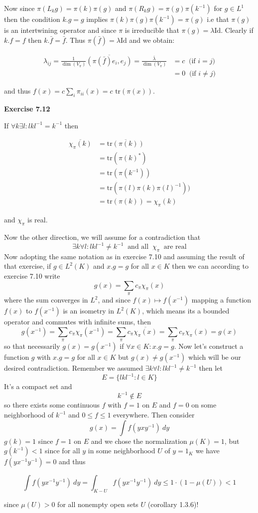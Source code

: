 \documentclass{article}
\begin{document}
Now since $\pi(L_kg) = \pi(k)\pi(g)$ and $\pi(R_kg) = \pi(g)\pi(k^{-1})$ for $g \in L^1$ then the condition $k.g = g$ implies $\pi(k)\pi(g) \pi(k^{-1}) = \pi(g)$ i.e that $\pi(g)$ is an intertwining operator and since $\pi$ is irreducible that $\pi(g) = \lambda  \text{Id}$. Clearly if $k.f = f$ then $k.\bar f = \bar f$. Thus $\pi(\bar f) = \lambda \text{Id}$ and we obtain:

\begin{align*}
     \lambda_{ij} = \frac{1}{\dim(V_\pi)} \overline{(\pi(\bar f)e_i, e_j)} = \frac{\bar \lambda}{\dim(V_\pi)} &= c \ \text{ (if } i = j) \\
     & = 0 \ \text{ (if } i \neq j)
\end{align*}

and thus $f(x) = c \sum\limits_{i} \pi_{ii}(x) = c \text{ tr}(\pi(x))$.

\vspace{0.5cm}

\textbf{Exercise 7.12}

\vspace{0.5cm}

If $\forall k\exists l: lkl^{-1} = k^{-1}$ then 

\begin{align*}
    \overline{\chi_\pi(k)} & =\overline{\text{tr}(\pi(k))}  \\
    & = \text{tr}(\pi(k)^*) \\
    & = \text{tr}(\pi(k^{-1}))\\
    & = \text{tr}(\pi(l)\pi(k)\pi(l)^{-1})) \\
    & = \text{tr}(\pi(k)) = \chi_\pi(k)
\end{align*}

and $\chi_\pi$ is real. 

Now the other direction, we will assume for a contradiction that 
$$\exists k \forall l : lkl^{-1} \neq k^{-1} \ \text{ and all } \ \chi_\pi \  \text{ are real}$$ 
Now adopting the same notation as in exercise 7.10 and assuming the result of that exercise, if $g \in L^2(K)$ and $x.g = g$ for all $x \in K$ then we can according to exercise 7.10 write 
$$g(x) = \sum\limits_\pi c_\pi \chi_\pi(x)$$      
where the sum converges in $L^2$, and since $f(x) \mapsto f(x^{-1})$ mapping a function $f(x)$ to $f(x^{-1})$ is an isometry in $L^2(K)$, which means its a bounded operator and commutes with infinite sums, then 
$$g(x^{-1}) = \sum\limits_\pi c_\pi \chi_\pi(x^{-1}) = \sum\limits_\pi c_\pi \overline{\chi_\pi(x)} = \sum\limits_\pi c_\pi \chi_\pi(x) = g(x)$$
so that necessarily $g(x) = g(x^{-1})$ if $\forall x \in K :x.g = g$. Now let's construct a function $g$ with $x.g = g$ for all $x \in K$ but $g(x) \neq g(x^{-1})$ which will be our desired contradiction. Remember we assumed $\exists k \forall l : lkl^{-1} \neq k^{-1}$ then let 
$$E = \{ lkl^{-1}: l \in K\}$$ 
It's a compact set and 
$$k^{-1} \not \in E$$ 
so there exists some continuous $f$ with $f = 1$ on $E$ and $f=0$ on some neighborhood of $k^{-1}$ and $0 \leq f \leq 1$ everywhere. Then consider 
$$g(x) = \int f(yxy^{-1}) \ dy$$
$g(k) = 1$ since $f = 1$ on $E$ and we chose the normalization $\mu(K) = 1$, but $g(k^{-1}) < 1$ since for all $y$ in some neighborhood $U$ of $y = 1_K$ we have $f(yx^{-1}y^{-1}) = 0$ and thus

$$\int f(yx^{-1}y^{-1}) \ dy = \int_{K - U} f(yx^{-1}y^{-1}) \ dy \leq 1 \cdot (1 - \mu(U)) < 1$$

since $\mu(U) > 0$ for all nonempty open sets $U$ (corollary 1.3.6)!
\end{document}
